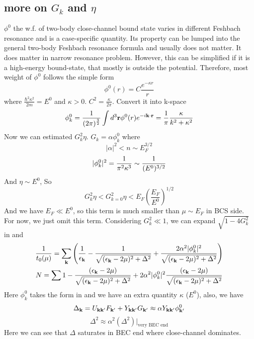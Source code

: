 \subsection{more on $G_{k}$ and $\eta$}
$\phi^{0}$ the w.f. of two-body close-channel bound state varies in different Feshbach resonance and is a case-specific quantity.  Its property can be lumped into the general two-body Feshbach resonance formula and usually does not matter.  It does matter in narrow resonance problem.  However, this can be simplified if it is a high-energy bound-state, that mostly is outside the potential.  Therefore, most weight of $\phi^{0}$ follows the simple form 
\[
\phi^{0}(r)=C\frac{e^{-\kappa{r}}}{r}
\]
 where $\frac{\hbar^{2}\kappa^{2}}{2m}=E^{0}$ and $\kappa>0$.  $C^{2}=\frac{\kappa}{2\pi}$.  Convert it into k-space
 \begin{equation}\label{eq:20101011:phi}
\phi^{0}_k=\frac{1}{(2\pi)^{\frac32}}\int{d^{3}\ensuremath{\mathbf{r}}\phi^{0}(r)e^{-i\ensuremath{\mathbf{k}}\cdot\ensuremath{\mathbf{r}}}}=\frac{1}{\pi}\frac{\kappa}{k^{2}+\kappa^{2}}
\end{equation}
Now we can estimated $G_{k}^{2}\eta$. $G_{k}=\alpha\phi^{0}_{k}$ where 
\[|\alpha|^{2}<n\sim{E_{F}^{3/2}}\]
\[
\lvert{\phi^{0}_{k}}\rvert^{2}=\frac{1}{\pi^{2}\kappa^{3}}\sim\frac{1}{(E^{0})^{3/2}}
\]
And $\eta\sim{E^{0}}$, So 
\[
G_{k}^{2}\eta<G_{k=0}^{2}\eta<E_{F}(\frac{E_{F}}{E^{0}})^{1/2}
\]
And we have $E_{F}\ll{E^{0}}$, so this term is much smaller than $\mu\sim{E_{F}}$ in BCS side. For now, we just omit this term.  Considering $G_{k}^{2}\ll1$, we can expand $\sqrt{1-4G_{k}^{2}}$ in  and  
\begin{gather}
\frac{1}{{t_{0}}(\mu)}=\sum_{\mathbf{k}}
\left(\frac{1}{\epsilon_{\mathbf{k}}}-\frac{1}{\sqrt{{(\epsilon_{\mathbf{k}}-2\mu)^{2}+\Delta^{2}}}}
+\frac{2\alpha^{2}|\phi^{0}_{k}|^{2}}{\sqrt{{(\epsilon_{\mathbf{k}}-2\mu)^{2}+\Delta^{2}}}}\right)\label{eq:20101011:gapa}
\\
N=\sum{1-\frac{(\epsilon_{\ensuremath{\mathbf{k}}}-2\mu)}{{\sqrt{{(\epsilon_{\ensuremath{\mathbf{k}}}-2\mu)^{2}+\Delta^{2}}}}}
+2\alpha^{2}|\phi^{0}_{k}|^{2}\frac{(\epsilon_{\ensuremath{\mathbf{k}}}-2\mu)}{{\sqrt{{(\epsilon_{\ensuremath{\mathbf{k}}}-2\mu)^{2}+\Delta^{2}}}}}}
\label{eq:20101011:gapb}
\end{gather}
Here $\phi^{0}_{k}$ takes the form in  and we have an extra quantity $\kappa$ ($E^{0}$), also, we have 
\begin{equation}
\Delta_{\mathbf{k}}=U_{\mathbf{k}\mathbf{k}'}F_{\mathbf{k}'}+Y_{\mathbf{k}\mathbf{k}'}G_{\mathbf{k}'}\approx\alpha{Y_{\ensuremath{\mathbf{k}}\ensuremath{\mathbf{k}}'}\phi^{0}_{\ensuremath{\mathbf{k}}'}}
\end{equation}
\[\Delta^{2}\approx\alpha^{2}(\Delta^{2})|_{\text{very BEC end}}
\]
Here we can see that $\Delta$ saturates in BEC end where close-channel dominates.  
